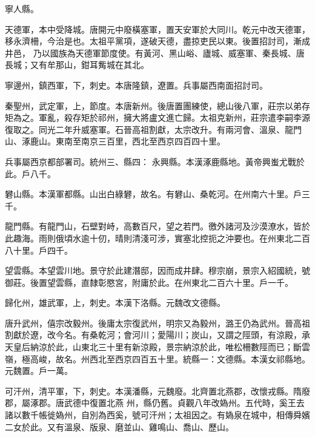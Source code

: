 \begin{pinyinscope}
 寧人縣。



 天德軍，本中受降城。唐開元中廢橫塞軍，置天安軍於大同川。乾元中改天德軍，移永濟柵，今治是也。太祖平黨項，遂破天德，盡掠吏民以東。後置招討司，漸成井邑，
 乃以國族為天德軍節度使。有黃河、黑山峪、廬城、威塞軍、秦長城、唐長城；又有牟那山，鉗耳觜城在其北。



 寧邊州，鎮西軍，下，刺史。本唐隆鎮，遼置。兵事屬西南面招討司。



 秦聖州，武定軍，上，節度。本唐新州。後唐置團練使，總山後八軍，莊宗以弟存矩為之。軍亂，殺存矩於祁州，擁大將盧文進亡歸。太祖克新州，莊宗遣李嗣李源復取之。同光二年升威塞軍。石晉高祖割獻，太宗改升。有兩河會、溫泉、龍門山、涿鹿山。東南至南京三百里，西北至西京四百四十里。



 兵事屬西京都部署司。統州三、縣四：
 永興縣。本漢涿鹿縣地。黃帝興蚩尤戰於此。戶八千。



 礬山縣。本漢軍都縣。山出白綠礬，故名。有礬山、桑乾河。在州南六十里。戶三千。



 龍門縣。有龍門山，石壁對峙，高數百尺，望之若門。徼外諸河及沙漠潦水，皆於此趣海。雨則俄頃水逾十仞，晴則清淺可涉，實塞北控扼之沖要也。在州東北二百八十里。戶四千。



 望雲縣。本望雲川地。景守於此建潛邸，因而成井肆。穆宗崩，景宗入紹國統，號御莊。後置望雲縣，直隸彰愍宮，附庸於此。在州東北二百六十里。戶一千。



 歸化州，雄武軍，上，刺史。本漢下洛縣。元魏改文德縣。



 唐升武州，僖宗改毅州。後庸太宗復武州，明宗又為毅州，潞王仍為武州。晉高祖割獻於遼，改今名。有桑乾河；會河川；愛陽川；炭山，又謂之陘頭，有涼殿，承天皇后納涼於此，山東北三十里有新涼殿，景宗納涼於此，唯松柵數陘而已；斷雲嶺，極高峻，故名。州西北至西京四百五十里。統縣一：文德縣。本漢女祁縣地。元魏置。戶一萬。



 可汗州，清平軍，下，刺史。本漢潘縣，元魏廢。北齊置北燕郡，改懷戎縣。隋廢郡，屬涿郡。唐武德中復置北燕
 州，縣仍舊。貞觀八年改媯州。五代時，奚王去諸以數千帳徙媯州，自別為西奚，號可汗州；太祖因之。有媯泉在城中，相傳舜嬪二女於此。又有溫泉、版泉、磨並山、雞鳴山、喬山、歷山。




\end{pinyinscope}
